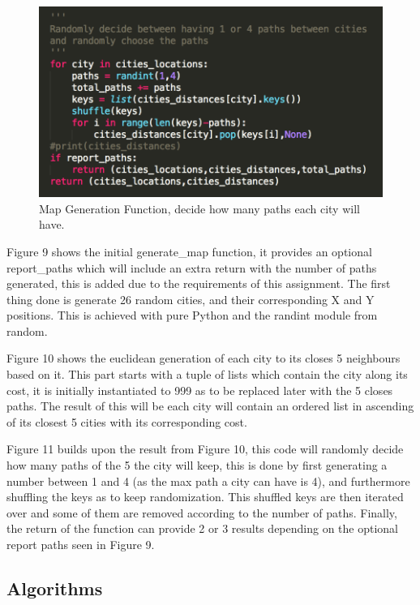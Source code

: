 \documentclass[12pt, letter]{article}
\begin{document}
\begin{figure}[htb]
  \centering
  \includegraphics[width=0.9 \textwidth]{./graphs/generate_map_3.png}
  \caption{Map Generation Function, decide how many paths each city will have.}
\end{figure}

Figure 9 shows the initial generate\_map function, it provides an optional report\_paths which will include an extra return with the number of paths generated, this is added due to the requirements of this assignment. The first thing done is generate 26 random cities, and their corresponding X and Y positions. This is achieved with pure Python and the randint module from random. 

Figure 10 shows the euclidean generation of each city to its closes 5 neighbours based on it. This part starts with a tuple of lists which contain the city along its cost, it is initially instantiated to 999 as to be replaced later with the 5 closes paths. The result of this will be each city will contain an ordered list in ascending of its closest 5 cities with its corresponding cost. 

Figure 11 builds upon the result from Figure 10, this code will randomly decide how many paths of the 5 the city will keep, this is done by first generating a number between 1 and 4 (as the max path a city can have is 4), and furthermore shuffling the keys as to keep randomization. This shuffled keys are then iterated over and some of them are removed according to the number of paths. Finally, the return of the function can provide 2 or 3 results depending on the optional report paths seen in Figure 9. 

\FloatBarrier

\subsection{Algorithms}
\end{document}
